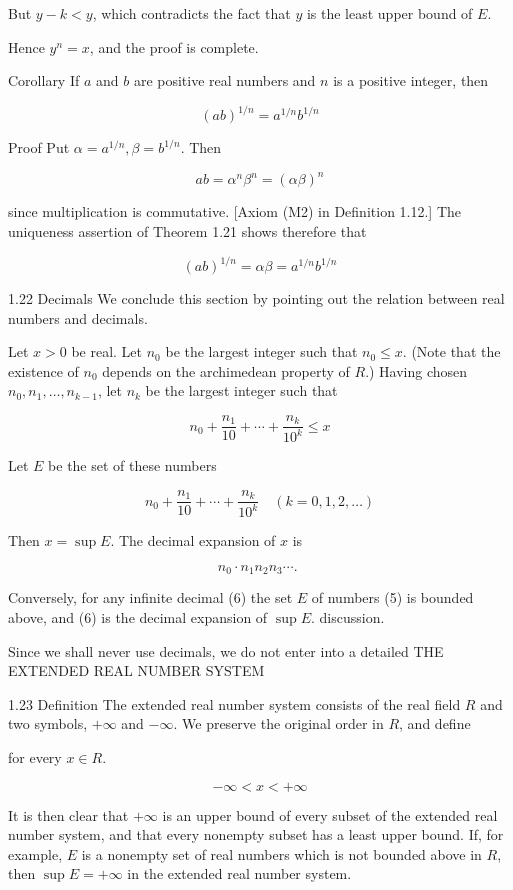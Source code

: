 \documentclass[10pt]{article}
\begin{document}
But $y-k<y$, which contradicts the fact that $y$ is the least upper bound of $E$.

Hence $y^{n}=x$, and the proof is complete.

Corollary If $a$ and $b$ are positive real numbers and $n$ is a positive integer, then

$$
(a b)^{1 / n}=a^{1 / n} b^{1 / n}
$$

Proof Put $\alpha=a^{1 / n}, \beta=b^{1 / n}$. Then

$$
a b=\alpha^{n} \beta^{n}=(\alpha \beta)^{n}
$$

since multiplication is commutative. [Axiom (M2) in Definition 1.12.] The uniqueness assertion of Theorem 1.21 shows therefore that

$$
(a b)^{1 / n}=\alpha \beta=a^{1 / n} b^{1 / n}
$$

1.22 Decimals We conclude this section by pointing out the relation between real numbers and decimals.

Let $x>0$ be real. Let $n_{0}$ be the largest integer such that $n_{0} \leq x$. (Note that the existence of $n_{0}$ depends on the archimedean property of $R$.) Having chosen $n_{0}, n_{1}, \ldots, n_{k-1}$, let $n_{k}$ be the largest integer such that

$$
n_{0}+\frac{n_{1}}{10}+\cdots+\frac{n_{k}}{10^{k}} \leq x
$$

Let $E$ be the set of these numbers

$$
n_{0}+\frac{n_{1}}{10}+\cdots+\frac{n_{k}}{10^{k}} \quad(k=0,1,2, \ldots)
$$

Then $x=\sup E$. The decimal expansion of $x$ is

$$
n_{0} \cdot n_{1} n_{2} n_{3} \cdots \text {. }
$$

Conversely, for any infinite decimal (6) the set $E$ of numbers (5) is bounded above, and (6) is the decimal expansion of $\sup E$. discussion.

Since we shall never use decimals, we do not enter into a detailed THE EXTENDED REAL NUMBER SYSTEM

1.23 Definition The extended real number system consists of the real field $R$ and two symbols, $+\infty$ and $-\infty$. We preserve the original order in $R$, and define

for every $x \in R$.

$$
-\infty<x<+\infty
$$

It is then clear that $+\infty$ is an upper bound of every subset of the extended real number system, and that every nonempty subset has a least upper bound. If, for example, $E$ is a nonempty set of real numbers which is not bounded above in $R$, then $\sup E=+\infty$ in the extended real number system.
\end{document}
